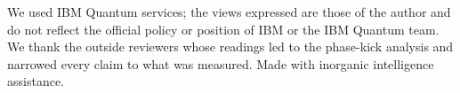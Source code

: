 \documentclass[reprint,amsmath,amssymb,aps,superscriptaddress,nofootinbib]{revtex4-2}
\begin{document}
\begin{acknowledgments}
We used IBM Quantum services; the views expressed are those of the author and do not reflect the official policy or position of IBM or the IBM Quantum team. We thank the outside reviewers whose readings led to the phase-kick analysis and narrowed every claim to what was measured. Made with inorganic intelligence assistance.
\end{acknowledgments}


\end{document}

